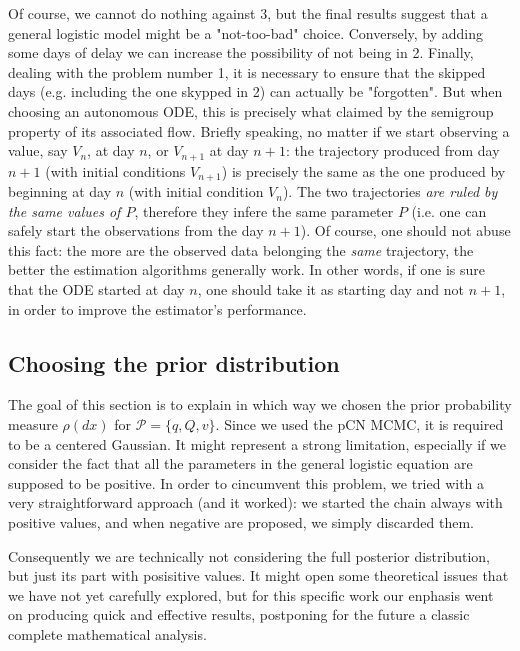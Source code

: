 \documentclass[8pt]{article}
\begin{document}
Of course, we cannot do nothing against $3$, but the final results suggest
that a general logistic model might be a "not-too-bad" choice.
Conversely, by adding some days of delay we can increase the
possibility of not being in 2.
Finally, dealing with the problem number 1,
it is necessary to ensure that the skipped days 
(e.g. including the one skypped in 2)
can actually be "forgotten".
But when choosing an autonomous ODE, this is precisely what
claimed by the semigroup property of its associated flow.
Briefly speaking,
no matter if we start observing a value, say $V_n$, at 
day $n$, or $V_{n+1}$ at day $n+1$: 
the trajectory produced from day $n+1$ (with initial
conditions $V_{n+1}$) is precisely the same as the one
produced by beginning at day $n$ (with initial condition $V_n$).
The two trajectories \emph{are ruled by the same values of $P$},
therefore they infere the same parameter $P$ (i.e. one can safely
start the observations from the day $n+1$).
Of course, one should not abuse this fact:
the more are the observed data belonging the \emph{same}
trajectory, the better the estimation algorithms generally work.
In other words, if one is sure that the ODE started at day $n$,
one should take it as starting day and not $n+1$, in order to
improve the estimator's performance.


\subsection{Choosing the prior distribution}
The goal of this section is to explain in which way we chosen the
prior probability measure $\rho(dx)$ for $\mathcal{P} = \{q, Q, v\}$.
Since we used the pCN MCMC, it is required to be a centered Gaussian. 
It might represent
a strong limitation, especially if we consider the fact
that all the parameters in the general logistic equation
are supposed to be positive. In order to cincumvent this problem,
we tried with a very straightforward approach (and it worked):
we started the chain always with positive values,
and when negative are proposed, we simply discarded them.


Consequently we are technically not considering the full posterior
distribution, but just its part with posisitive values. It might open
some theoretical issues that we have not yet carefully explored,
but for this specific work our enphasis went on producing quick
and effective results, postponing for the future a classic complete
mathematical analysis.
\end{document}
